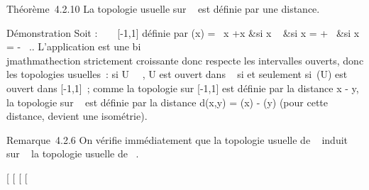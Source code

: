 \documentclass[]{article}
\begin{document}
Théorème~4.2.10 La topologie usuelle sur \overline{}~
est définie par une distance.

Démonstration Soit \phi : \overline{}~ \rightarrow~ {[}-1,1{]}
définie par \phi(x) = \left \
\cases  x +x &si x \in {}~  &si x = +\infty~
 &si x = -\infty~ \cr 
\right .. L'application \phi est une bi\\jmathmathection strictement
croissante donc respecte les intervalles ouverts, donc les topologies
usuelles~: si U \subset~\overline{}~, U est ouvert dans
\overline\mathbb{R}~ si et seulement si~\phi(U) est ouvert dans
{[}-1,1{]}~; comme la topologie sur {[}-1,1{]} est définie par la
distance x - y, la topologie sur
\overline{}~ est définie par la distance d(x,y) =
\phi(x) - \phi(y) (pour cette distance, \phi devient une
isométrie).

Remarque~4.2.6 On vérifie immédiatement que la topologie usuelle de
\overline{}~ induit sur ~ la topologie usuelle de \mathbb{R}~.

{[}
{[}
{[}
{[}
\end{document}
